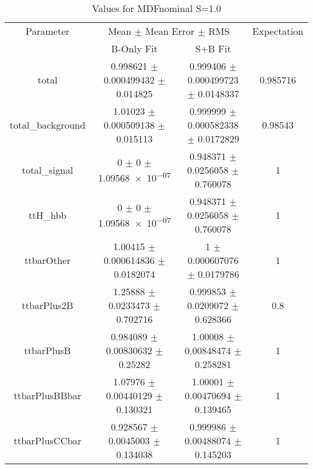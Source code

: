 \begin{table}
\centering
\caption{Values for MDFnominal S=1.0}
\begin{tabular}{cccc}
\toprule
Parameter & \multicolumn{2}{c}{Mean $\pm$ Mean Error $\pm$ RMS} & Expectation\\
 & B-Only Fit & S+B Fit & \\
\midrule
total & \num{0.998621} $\pm$ \num{0.000499432} $\pm$ \num{0.014825} & \num{0.999406} $\pm$ \num{0.000499723} $\pm$ \num{0.0148337} & \num{0.985716}\\
total\_background & \num{1.01023} $\pm$ \num{0.000509138} $\pm$ \num{0.015113} & \num{0.999999} $\pm$ \num{0.000582338} $\pm$ \num{0.0172829} & \num{0.98543}\\
total\_signal & \num{0} $\pm$ \num{0} $\pm$ \num{1.09568e-07} & \num{0.948371} $\pm$ \num{0.0256058} $\pm$ \num{0.760078} & \num{1}\\
ttH\_hbb & \num{0} $\pm$ \num{0} $\pm$ \num{1.09568e-07} & \num{0.948371} $\pm$ \num{0.0256058} $\pm$ \num{0.760078} & \num{1}\\
ttbarOther & \num{1.00415} $\pm$ \num{0.000614836} $\pm$ \num{0.0182074} & \num{1} $\pm$ \num{0.000607076} $\pm$ \num{0.0179786} & \num{1}\\
ttbarPlus2B & \num{1.25888} $\pm$ \num{0.0233473} $\pm$ \num{0.702716} & \num{0.999853} $\pm$ \num{0.0209072} $\pm$ \num{0.628366} & \num{0.8}\\
ttbarPlusB & \num{0.984089} $\pm$ \num{0.00830632} $\pm$ \num{0.25282} & \num{1.00008} $\pm$ \num{0.00848474} $\pm$ \num{0.258281} & \num{1}\\
ttbarPlusBBbar & \num{1.07976} $\pm$ \num{0.00440129} $\pm$ \num{0.130321} & \num{1.00001} $\pm$ \num{0.00470694} $\pm$ \num{0.139465} & \num{1}\\
ttbarPlusCCbar & \num{0.928567} $\pm$ \num{0.0045003} $\pm$ \num{0.134038} & \num{0.999986} $\pm$ \num{0.00488074} $\pm$ \num{0.145203} & \num{1}\\
\bottomrule
\end{tabular}
\end{table}